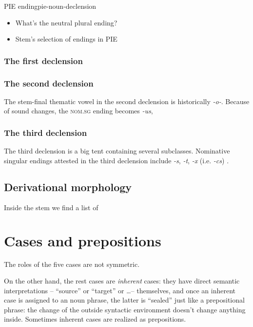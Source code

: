 \documentclass[a4paper, oneside, 12pt]{report}
\newcommand*{\citesec}[1]{\S~{#1}}
\newcommand{\form}[1]{\emph{#1}}
\newcommand*{\category}[1]{\textsc{#1}}
\begin{document}
\begin{todobox}{PIE ending}{pie-noun-declension}
    \begin{itemize}
        \item What's the neutral plural ending?
        \item Stem's selection of endings in PIE
    \end{itemize}
\end{todobox}

\subsection{The first declension}



\subsection{The second declension}

The stem-final thematic vowel in the second declension is historically \form{-o-}.
Because of sound changes, the \category{nom.sg} ending becomes \form{-us},

\subsection{The third declension}\label{sec:np.inflection.3}

The third declension is a big tent containing several subclasses.
Nominative singular endings attested in the third declension
include \form{-s}, \form{-t}, \form{-x} (i.e. \form{-cs}) \citep[\citesec{53}]{allen1903allen}.

\section{Derivational morphology}

Inside the stem we find a list of

\chapter{Cases and prepositions}\label{chap:case-distribution}

The roles of the five cases are not symmetric.


On the other hand, the rest cases are \emph{inherent} cases:
they have direct semantic interpretations
-- ``source'' or ``target'' or \dots -- themselves,
and once an inherent case is assigned to an noun phrase,
the latter is ``sealed'' just like a prepositional phrase:
the change of the outside syntactic environment 
doesn't change anything inside.
Sometimes inherent cases are realized as prepositions.
\end{document}
